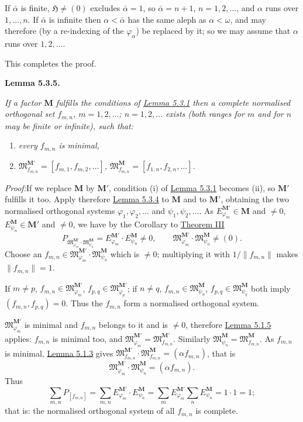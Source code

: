 \documentclass[12pt,b5paper,twoside]{article}
\newcommand{\Hspace}{\mathfrak H}
\newcommand{\M}{\mathbf M}
\newcommand{\Lemma}[1]{%
  \par\smallskip\noindent\phantomsection\label{lem:#1}\textbf{Lemma #1.}\enspace
}
\newcommand{\Proof}{\par\noindent\textit{Proof:}\enspace}
\newcommand{\lemref}[1]{\hyperref[lem:#1]{Lemma #1}}
\newcommand{\thmref}[1]{\hyperref[thm:#1]{Theorem #1}}
\begin{document}
If $\bar\alpha$ is finite, $\Hspace\neq(0)$ excludes $\bar\alpha=1$, so
$\bar\alpha=n+1$, $n=1,2,\ldots$, and $\alpha$ runs over $1,\ldots,n$.
If $\bar\alpha$ is infinite then $\alpha<\bar\alpha$ has the same aleph as
$\alpha<\omega$, and may therefore (by a re-indexing of the $\varphi_\alpha$)
be replaced by it; so we may assume that $\alpha$ runs over $1,2,\ldots$.

This completes the proof.

\Lemma{5.3.5}
\emph{If a factor $\M$ fulfills the conditions of \lemref{5.3.1} then a
complete normalised orthogonal set $f_{m,n}$, $m=1,2,\ldots$;
$n=1,2,\ldots$ exists (both ranges for $m$ and for $n$ may be finite or
infinite), such that:}
\begin{enumerate}[label=(\roman*)]
\item \emph{every $f_{m,n}$ is minimal,}
\item \emph{$\mathfrak M_{f_{m,n}}^{\M'}=[f_{m,1},f_{m,2},\ldots]$,
  $\mathfrak M_{f_{m,n}}^{\M}=[f_{1,n},f_{2,n},\ldots]$.}
\end{enumerate}

\Proof If we replace $\M$ by $\M'$, condition (i) of \lemref{5.3.1} becomes
(ii), so $\M'$ fulfills it too. Apply therefore \lemref{5.3.4} to $\M$ and
to $\M'$, obtaining the two normalised orthogonal systems
$\varphi_1,\varphi_2,\ldots$ and $\psi_1,\psi_2,\ldots$. As
$E_{\varphi_m}^{\M'}\in\M$ and $\neq0$,
$E_{\psi_n}^{\M}\in\M'$ and $\neq0$, we have by the Corollary to
\thmref{III}
\[
 P_{\mathfrak M_{\varphi_m}^{\M'}\cdot
    \mathfrak M_{\psi_n}^{\M}}
 =E_{\varphi_m}^{\M'}\cdot E_{\psi_n}^{\M}\neq0,
 \qquad
 \mathfrak M_{\varphi_m}^{\M'}\cdot
 \mathfrak M_{\psi_n}^{\M}\neq(0).
\]
Choose an
$f_{m,n}\in\mathfrak M_{\varphi_m}^{\M'}\cdot
\mathfrak M_{\psi_n}^{\M}$ which is $\neq0$; multiplying it with
$1/\lVert f_{m,n}\rVert$ makes $\lVert f_{m,n}\rVert=1$.

If $m\neq p$, $f_{m,n}\in\mathfrak M_{\varphi_m}^{\M'}$,
$f_{p,q}\in\mathfrak M_{\varphi_p}^{\M'}$; if $n\neq q$,
$f_{m,n}\in\mathfrak M_{\psi_n}^{\M}$,
$f_{p,q}\in\mathfrak M_{\psi_q}^{\M}$ both imply
$(f_{m,n},f_{p,q})=0$. Thus the $f_{m,n}$ form a normalised orthogonal system.

$\mathfrak M_{\varphi_m}^{\M'}$ is minimal and $f_{m,n}$ belongs to it and is
$\neq0$, therefore \lemref{5.1.5} applies: $f_{m,n}$ is minimal too, and
$\mathfrak M_{\varphi_m}^{\M'}=\mathfrak M_{f_{m,n}}^{\M'}$. Similarly
$\mathfrak M_{\psi_n}^{\M}=\mathfrak M_{f_{m,n}}^{\M}$. As $f_{m,n}$ is
minimal, \lemref{5.1.3} gives
$\mathfrak M_{f_{m,n}}^{\M'}\cdot
\mathfrak M_{f_{m,n}}^{\M}=(\alpha f_{m,n})$, that is
\[
 \mathfrak M_{\varphi_m}^{\M'}\cdot
 \mathfrak M_{\psi_n}^{\M}=(\alpha f_{m,n}).
\]
Thus
\[
 \sum_{m,n}P_{[f_{m,n}]}
 =\sum_{m,n}E_{\varphi_m}^{\M'}\cdot E_{\psi_n}^{\M}
 =\sum_mE_{\varphi_m}^{\M'}\sum_nE_{\psi_n}^{\M}
 =1\cdot1=1;
\]
that is: the normalised orthogonal system of all $f_{m,n}$ is complete.
\end{document}
